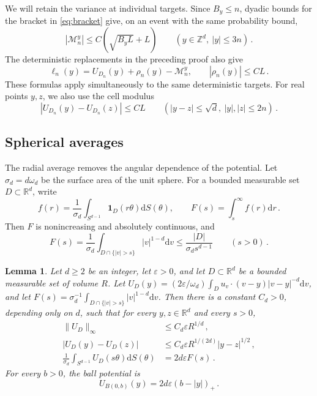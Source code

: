 \documentclass[11pt]{amsart}
\theoremstyle{plain}
\newtheorem{lemma}[theorem]{Lemma}
\theoremstyle{definition}
\newcommand{\Z}{\mathbb Z}
\newcommand{\R}{\mathbb R}
\newcommand{\eps}{\varepsilon}
\newcommand{\ind}{\mathbf 1}
\newcommand{\dd}{\mathrm d}
\begin{document}
We will retain the variance at individual targets. Since $B_y\leq n$,
dyadic bounds for the bracket in \eqref{eq:bracket} give, on an event
with the same probability bound,
\begin{equation}\label{eq:localmart}
|\mathcal M_n^y|\leq C(\sqrt{B_yL}+L)
\qquad(y\in\Z^d,\ |y|\leq3n)\, .
\end{equation}
The deterministic replacements in the preceding proof also give
\begin{equation}\label{eq:pointwise}
\ell_n(y)=U_{D_n}(y)+\rho_n(y)-\mathcal M_n^y ,\qquad
|\rho_n(y)|\leq CL\, .
\end{equation}
These formulas apply simultaneously to the same deterministic targets.
For real points $y,z$, we also use the cell modulus
\begin{equation}\label{eq:cellmodulus}
|U_{D_n}(y)-U_{D_n}(z)|\leq CL
\qquad(|y-z|\leq\sqrt d,\ |y|,|z|\leq2n)\, .
\end{equation}

\subsection{Spherical averages}
The radial average removes the angular dependence of the potential.
Let $\sigma_d=d\omega_d$ be the surface area of the unit sphere.
For a bounded measurable set $D\subset\R^d$, write
\begin{equation}\label{eq:Fdef}
f(r)=\frac1{\sigma_d}\int_{S^{d-1}}\ind_D(r\theta)\dd S(\theta) ,
\qquad F(s)=\int_s^\infty f(r)\dd r\, .
\end{equation}
Then $F$ is nonincreasing and absolutely continuous, and
\begin{equation}\label{eq:Fmass}
F(s)=\frac1{\sigma_d}\int_{D\cap\{|v|>s\}}|v|^{1-d}\dd v
\leq\frac{|D|}{\sigma_ds^{d-1}}
\qquad(s>0)\, .
\end{equation}

\begin{lemma}\label{lem:geometry}
Let $d\geq2$ be an integer, let $\eps>0$, and let $D\subset\R^d$
be a bounded measurable set of volume $R$. Let
$U_D(y)=(2\eps/\omega_d)\int_Du_v\cdot(v-y)|v-y|^{-d}\dd v$,
and let $F(s)=\sigma_d^{-1}\int_{D\cap\{|v|>s\}}|v|^{1-d}\dd v$.
Then there is a constant $C_d>0$, depending only on $d$, such that
for every $y,z\in\R^d$ and every $s>0$,
\begin{align}
\|U_D\|_\infty&\leq C_d\eps R^{1/d}\, ,\label{eq:potential-bound}\\
|U_D(y)-U_D(z)|&\leq C_d\eps R^{1/(2d)}|y-z|^{1/2}\, ,\label{eq:holder}\\
\frac1{\sigma_d}\int_{S^{d-1}}U_D(s\theta)\dd S(\theta)
&=2d\eps F(s)\, .\label{eq:newton}
\end{align}
For every $b>0$, the ball potential is
\begin{equation}\label{eq:ballpotential}
U_{B(0,b)}(y)=2d\eps(b-|y|)_+\, .
\end{equation}
\end{lemma}
\end{document}
